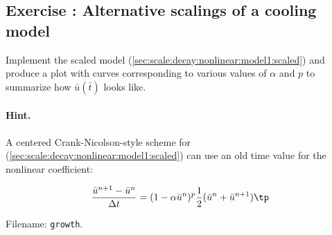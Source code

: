 \documentclass[graybox,envcountchap,sectrefs,final]{svmonodo}
\newcounter{doconce:movie:counter}
\newenvironment{doconceexercise}{}{}
\newcounter{doconceexercisecounter}
\begin{document}
\begin{doconceexercise}

\subsection*{Exercise \thedoconceexercisecounter: Alternative scalings of a cooling model}

\label{scale:decay:exer:nonlin:logistic2}

Implement the scaled model (\ref{sec:scale:decay:nonlinear:model1:scaled})
and produce a plot with curves corresponding to various values of
$\alpha$ and $p$ to summarize how $\bar u(\bar t)$ looks like.


\paragraph{Hint.}
A centered Crank-Nicolson-style
scheme for (\ref{sec:scale:decay:nonlinear:model1:scaled})
can use an old time value for the nonlinear coefficient:

\[ \frac{\bar u^{n+1} - \bar u^n}{\Delta t} =
(1 - \alpha\bar u^n)^p\frac{1}{2}(\bar u^n + \bar u^{n+1})\tp\]

\noindent Filename: \texttt{growth}.

\end{doconceexercise}
\end{document}
